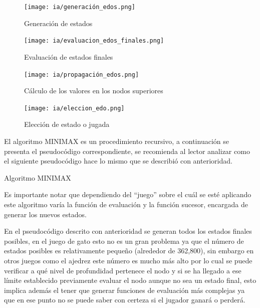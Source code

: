 \documentclass[11pt,fleqn]{book} %
\begin{document}
\begin{figure}[ht!]
\centering\texttt{[image: ia/generación\_edos.png]}
\caption{Generación de estados}
\label{fig:gen_edos_minimax} 
\end{figure}

\begin{figure}[ht!]
\centering\texttt{[image: ia/evaluacion\_edos\_finales.png]}
\caption{Evaluación de estados finales}
\label{fig:ev_edos_minimax} 
\end{figure}

\begin{figure}[ht!]
\centering\texttt{[image: ia/propagación\_edos.png]}
\caption{Cálculo de los valores en los nodos superiores}
\label{fig:prop_edos_minimax} 
\end{figure}

\begin{figure}[ht!]
\centering\texttt{[image: ia/eleccion\_edo.png]}
\caption{Elección de estado o jugada}
\label{fig:elec_edos_minimax} 
\end{figure}

\clearpage

El algoritmo MINIMAX es un procedimiento recursivo, a continuación se presenta el pseudocódigo correspondiente, se recomienda al lector analizar como el siguiente pseudocódigo hace lo mismo que se describió con anterioridad.


\begin{algorithm}
  \DontPrintSemicolon
  
  \;

  \caption{Algoritmo MINIMAX}
\end{algorithm}


Es importante notar que dependiendo del “juego” sobre el cuál se esté aplicando este algoritmo varía la función de evaluación y la función sucesor, encargada de generar los nuevos estados.

En el pseudocódigo descrito con anterioridad se generan todos los estados finales posibles, en el juego de gato esto no es un gran problema ya que el número de estados posibles es relativamente pequeño (alrededor de 362,800), sin embargo en otros juegos como el ajedrez este número es mucho más alto por lo cual se puede verificar a qué nivel de profundidad pertenece el nodo y si se ha llegado a ese límite establecido previamente evaluar el nodo aunque no sea un estado final, esto implica además el tener que generar funciones de evaluación más complejas ya que en ese punto no se puede saber con certeza si el jugador ganará o perderá.
\end{document}

